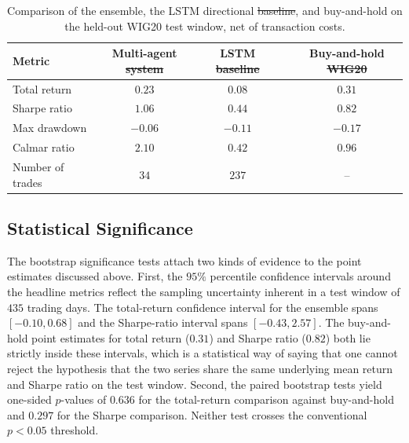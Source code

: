 \documentclass{ieeeaccess}
\newcommand{\TRtest}{\ensuremath{0.23}}
\newcommand{\TRtestCIlow}{\ensuremath{-0.10}}
\newcommand{\TRtestCIhigh}{\ensuremath{0.68}}
\newcommand{\Shtest}{\ensuremath{1.06}}
\newcommand{\ShtestCIlow}{\ensuremath{-0.43}}
\newcommand{\ShtestCIhigh}{\ensuremath{2.57}}
\newcommand{\MDDtest}{\ensuremath{-0.06}}
\newcommand{\Calmtest}{\ensuremath{2.10}}
\newcommand{\Ntrades}{\ensuremath{34}}
\newcommand{\BHtest}{\ensuremath{0.31}}
\newcommand{\BHsharpe}{\ensuremath{0.82}}
\newcommand{\MDDbh}{\ensuremath{-0.17}}
\newcommand{\Calmbh}{\ensuremath{0.96}}
\newcommand{\PvsBH}{\ensuremath{0.636}}
\newcommand{\PvsBHsharpe}{\ensuremath{0.297}}
\newcommand{\OOSDays}{\ensuremath{435}}
\newcommand{\LSTMtest}{\ensuremath{0.08}}
\newcommand{\LSTMsharpe}{\ensuremath{0.44}}
\newcommand{\LSTMmdd}{\ensuremath{-0.11}}
\newcommand{\LSTMcalmar}{\ensuremath{0.42}}
\newcommand{\LSTMtrades}{\ensuremath{237}}
\newcommand{\GBMtest}{\ensuremath{0.04}} %
\newcommand{\GBMsharpe}{\ensuremath{0.47}} %
\newcommand{\GBMmdd}{\ensuremath{-0.05}} %
\newcommand{\GBMcalmar}{\ensuremath{0.45}} %
\newcommand{\GBMtrades}{\ensuremath{34}} %
\providecommand{\DIFaddtex}[1]{{\protect\color{blue}\uwave{#1}}} %
\providecommand{\DIFdeltex}[1]{{\protect\color{red}\sout{#1}}}                      %
\providecommand{\DIFaddFL}[1]{\DIFadd{#1}} %
\providecommand{\DIFdelFL}[1]{\DIFdel{#1}} %
\providecommand{\DIFaddbeginFL}{} %
\providecommand{\DIFaddendFL}{} %
\providecommand{\DIFdelbeginFL}{} %
\providecommand{\DIFdelendFL}{} %
\providecommand{\DIFadd}[1]{\texorpdfstring{\DIFaddtex{#1}}{#1}} %
\providecommand{\DIFdel}[1]{\texorpdfstring{\DIFdeltex{#1}}{}} %
\newcommand{\DIFscaledelfig}{0.5}
\newlength{\DIFdelgraphicswidth} %
\newlength{\DIFdelgraphicsheight} %
\newcommand{\DIFaddincludegraphics}[2][]{{\color{blue}\fbox{\DIFOincludegraphics[#1]{#2}}}} %
\newcommand{\DIFdelincludegraphics}[2][]{%
\sbox{\DIFdelgraphicsbox}{\DIFOincludegraphics[#1]{#2}}%
\settoboxwidth{\DIFdelgraphicswidth}{\DIFdelgraphicsbox} %
\settoboxtotalheight{\DIFdelgraphicsheight}{\DIFdelgraphicsbox} %
\scalebox{\DIFscaledelfig}{%
\parbox[b]{\DIFdelgraphicswidth}{\usebox{\DIFdelgraphicsbox}\\[-\baselineskip] \rule{\DIFdelgraphicswidth}{0em}}\llap{\resizebox{\DIFdelgraphicswidth}{\DIFdelgraphicsheight}{%
\setlength{\unitlength}{\DIFdelgraphicswidth}%
\begin{picture}(1,1)%
\thicklines\linethickness{2pt} %
{\color[rgb]{1,0,0}\put(0,0){\framebox(1,1){}}}%
{\color[rgb]{1,0,0}\put(0,0){\line( 1,1){1}}}%
{\color[rgb]{1,0,0}\put(0,1){\line(1,-1){1}}}%
\end{picture}%
}\hspace*{3pt}}} %
} %
\DeclareRobustCommand{\DIFaddbeginFL}{\DIFOaddbeginFL \let\includegraphics\DIFaddincludegraphics} %
\DeclareRobustCommand{\DIFaddendFL}{\DIFOaddendFL \let\includegraphics\DIFOincludegraphics} %
\DeclareRobustCommand{\DIFdelbeginFL}{\DIFOdelbeginFL \let\includegraphics\DIFdelincludegraphics} %
\DeclareRobustCommand{\DIFdelendFL}{\DIFOaddendFL \let\includegraphics\DIFOincludegraphics} %
\begin{document}
\begin{table}[t]
\centering
\caption{Comparison of the ensemble, the LSTM \DIFaddbeginFL \DIFaddFL{and GBM }\DIFaddendFL directional \DIFdelbeginFL \DIFdelFL{baseline}\DIFdelendFL \DIFaddbeginFL \DIFaddFL{baselines}\DIFaddendFL , and buy-and-hold on the held-out WIG20 test window, net of transaction costs.}
\label{tab:lstm}
\DIFdelbeginFL %
\DIFdelendFL \begin{tabular}{lcccc}
\toprule
Metric & Multi-agent \DIFdelbeginFL \DIFdelFL{system }\DIFdelendFL & LSTM \DIFdelbeginFL \DIFdelFL{baseline }\DIFdelendFL \DIFaddbeginFL & \DIFaddFL{GBM }\DIFaddendFL & Buy-and-hold \DIFdelbeginFL \DIFdelFL{WIG20 }\DIFdelendFL \\
\midrule
Total return     & $\TRtest$   & $\LSTMtest$   & \DIFaddbeginFL \DIFaddFL{$\GBMtest$   }& \DIFaddendFL $\BHtest$ \\
Sharpe ratio     & $\Shtest$   & $\LSTMsharpe$ & \DIFaddbeginFL \DIFaddFL{$\GBMsharpe$ }& \DIFaddendFL $\BHsharpe$ \\
Max drawdown     & $\MDDtest$  & $\LSTMmdd$    & \DIFaddbeginFL \DIFaddFL{$\GBMmdd$    }& \DIFaddendFL $\MDDbh$ \\
Calmar ratio     & $\Calmtest$ & $\LSTMcalmar$ & \DIFaddbeginFL \DIFaddFL{$\GBMcalmar$ }& \DIFaddendFL $\Calmbh$ \\
Number of trades & $\Ntrades$  & $\LSTMtrades$ & \DIFaddbeginFL \DIFaddFL{$\GBMtrades$ }& \DIFaddendFL -- \\
\bottomrule
\end{tabular}
\end{table}

\subsection{Statistical Significance}
\label{subsec:significance}

The bootstrap significance tests attach two kinds of evidence to the point estimates discussed above. First, the $95\%$ percentile confidence intervals around the headline metrics reflect the sampling uncertainty inherent in a test window of \OOSDays{} trading days. The total-return confidence interval for the ensemble spans $[\TRtestCIlow, \TRtestCIhigh]$ and the Sharpe-ratio interval spans $[\ShtestCIlow, \ShtestCIhigh]$. The buy-and-hold point estimates for total return (\BHtest{}) and Sharpe ratio (\BHsharpe{}) both lie strictly inside these intervals, which is a statistical way of saying that one cannot reject the hypothesis that the two series share the same underlying mean return and Sharpe ratio on the test window. Second, the paired bootstrap tests yield one-sided $p$-values of \PvsBH{} for the total-return comparison against buy-and-hold and \PvsBHsharpe{} for the Sharpe comparison. Neither test crosses the conventional $p < 0.05$ threshold.
\end{document}
